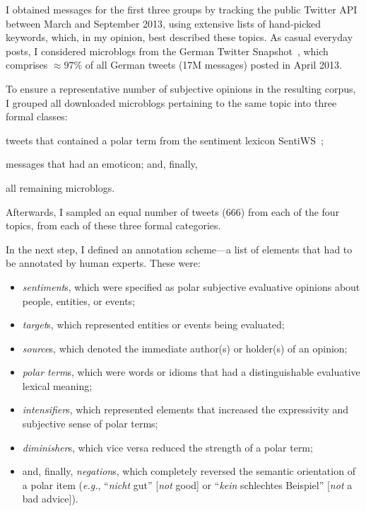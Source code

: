 \documentclass[11pt]{article}
\newcommand{\eg}{\textit{e.g.},}
\renewcommand{\cite}{\citep}
\begin{document}
I obtained messages for the first three groups by tracking the public
Twitter API between March and September 2013, using extensive lists of
hand-picked keywords, which, in my opinion, best described these
topics.  As casual everyday posts, I considered microblogs from the
German Twitter Snapshot~\cite{Scheffler:14}, which comprises
$\approx97\%$ of all German tweets (17M messages) posted in April
2013.

To ensure a representative number of subjective opinions in the
resulting corpus, I grouped all downloaded microblogs pertaining to
the same topic into three formal classes:
\begin{inparaenum}[(i)]
  \item tweets that contained a polar term from the sentiment lexicon
    SentiWS~\cite{Remus:10};
  \item messages that had an emoticon; and, finally,
  \item all remaining microblogs.
\end{inparaenum}
Afterwards, I sampled an equal number of tweets (666) from each of the
four topics, from each of these three formal categories.

In the next step, I defined an annotation scheme---a list of elements
that had to be annotated by human experts.  These were:
\begin{itemize}
  \item\emph{sentiment}s, which were specified as polar subjective
    evaluative opinions about people, entities, or events;

  \item\emph{target}s, which represented entities or events being
    evaluated;

  \item\emph{source}s, which denoted the immediate author(s) or
    holder(s) of an opinion;

  \item\emph{polar term}s, which were words or idioms that had a
    distinguishable evaluative lexical meaning;

  \item\emph{intensifier}s, which represented elements that increased
    the expressivity and subjective sense of polar terms;

  \item\emph{diminisher}s, which vice versa reduced the strength of a
    polar term;

  \item and, finally, \emph{negation}s, which completely reversed the
    semantic orientation of a polar item (\eg{} ``\emph{nicht} gut''
    [\emph{not} good] or ``\emph{kein} schlechtes Beispiel''
    [\emph{not} a bad advice]).
\end{itemize}
\end{document}
